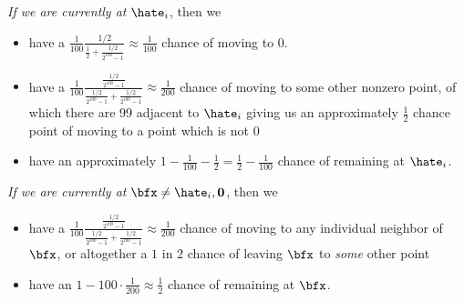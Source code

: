 \begin{homework}[e]
\begin{prf}
    \bigskip

    \noindent\emph{If we are currently at }$\hate_i$, then we
    \begin{itemize}
      \item have a $\frac{1}{100}\frac{1/2}{\frac{1}{2}+\frac{1/2}{2^{100}-1}}\approx \frac{1}{100}$ chance of moving to 0.
      \item have a $\frac{1}{100}\frac{\frac{1/2}{2^{100}-1}}{\frac{1/2}{2^{100}-1} + \frac{1/2}{2^{100}-1}}\approx \frac{1}{200}$ chance of moving to some other nonzero point, of which there are 99 adjacent to $\hate_i$ giving us an approximately $\frac{1}{2}$ chance point of moving to a point which is not $0$
      \item have an approximately $1 - \frac{1}{100} - \frac{1}{2} = \frac{1}{2}-\frac{1}{100}$ chance of remaining at $\hate_i$.
    \end{itemize}

    \bigskip

    \emph{If we are currently at } $\bfx\neq \hate_i, \mathbf{0}$, then we
    \begin{itemize}
      \item have a $\frac{1}{100}\frac{\frac{1/2}{2^{100}-1}}{\frac{1/2}{2^{100}-1}+\frac{1/2}{2^{100}-1}} \approx \frac{1}{200}$ chance of moving to any individual neighbor of $\bfx$, or altogether a $1$ in $2$ chance of leaving $\bfx$ to \emph{some} other point
      \item have an $1 - 100\cdot \frac{1}{200} \approx \frac{1}{2}$ chance of remaining at $\bfx$.
    \end{itemize}


\end{prf}
\end{homework}
